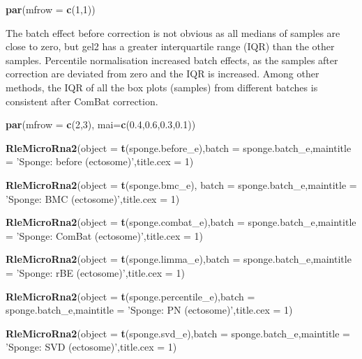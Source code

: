 \documentclass[]{book}
\newenvironment{Shaded}{\begin{snugshade}}{\end{snugshade}}
\newcommand{\KeywordTok}[1]{\textcolor[rgb]{0.13,0.29,0.53}{\textbf{#1}}}
\newcommand{\DataTypeTok}[1]{\textcolor[rgb]{0.13,0.29,0.53}{#1}}
\newcommand{\DecValTok}[1]{\textcolor[rgb]{0.00,0.00,0.81}{#1}}
\newcommand{\FloatTok}[1]{\textcolor[rgb]{0.00,0.00,0.81}{#1}}
\newcommand{\StringTok}[1]{\textcolor[rgb]{0.31,0.60,0.02}{#1}}
\newcommand{\NormalTok}[1]{#1}
\begin{document}
\begin{Shaded}
\begin{Highlighting}[]
\KeywordTok{par}\NormalTok{(}\DataTypeTok{mfrow =} \KeywordTok{c}\NormalTok{(}\DecValTok{1}\NormalTok{,}\DecValTok{1}\NormalTok{))}
\end{Highlighting}
\end{Shaded}

The batch effect before correction is not obvious as all medians of
samples are close to zero, but gel2 has a greater interquartile range
(IQR) than the other samples. Percentile normalisation increased batch
effects, as the samples after correction are deviated from zero and the
IQR is increased. Among other methods, the IQR of all the box plots
(samples) from different batches is consistent after ComBat correction.

\begin{Shaded}
\begin{Highlighting}[]
\KeywordTok{par}\NormalTok{(}\DataTypeTok{mfrow =} \KeywordTok{c}\NormalTok{(}\DecValTok{2}\NormalTok{,}\DecValTok{3}\NormalTok{), }\DataTypeTok{mai=}\KeywordTok{c}\NormalTok{(}\FloatTok{0.4}\NormalTok{,}\FloatTok{0.6}\NormalTok{,}\FloatTok{0.3}\NormalTok{,}\FloatTok{0.1}\NormalTok{))}

\KeywordTok{RleMicroRna2}\NormalTok{(}\DataTypeTok{object =} \KeywordTok{t}\NormalTok{(sponge.before_e),}\DataTypeTok{batch =}\NormalTok{ sponge.batch_e,}\DataTypeTok{maintitle =} \StringTok{'Sponge: before (ectosome)'}\NormalTok{,}\DataTypeTok{title.cex =} \DecValTok{1}\NormalTok{)}

\KeywordTok{RleMicroRna2}\NormalTok{(}\DataTypeTok{object =} \KeywordTok{t}\NormalTok{(sponge.bmc_e), }\DataTypeTok{batch =}\NormalTok{ sponge.batch_e,}\DataTypeTok{maintitle =} \StringTok{'Sponge: BMC (ectosome)'}\NormalTok{,}\DataTypeTok{title.cex =} \DecValTok{1}\NormalTok{)}

\KeywordTok{RleMicroRna2}\NormalTok{(}\DataTypeTok{object =} \KeywordTok{t}\NormalTok{(sponge.combat_e),}\DataTypeTok{batch =}\NormalTok{ sponge.batch_e,}\DataTypeTok{maintitle =} \StringTok{'Sponge: ComBat (ectosome)'}\NormalTok{,}\DataTypeTok{title.cex =} \DecValTok{1}\NormalTok{)}

\KeywordTok{RleMicroRna2}\NormalTok{(}\DataTypeTok{object =} \KeywordTok{t}\NormalTok{(sponge.limma_e),}\DataTypeTok{batch =}\NormalTok{ sponge.batch_e,}\DataTypeTok{maintitle =} \StringTok{'Sponge: rBE (ectosome)'}\NormalTok{,}\DataTypeTok{title.cex =} \DecValTok{1}\NormalTok{)}

\KeywordTok{RleMicroRna2}\NormalTok{(}\DataTypeTok{object =} \KeywordTok{t}\NormalTok{(sponge.percentile_e),}\DataTypeTok{batch =}\NormalTok{ sponge.batch_e,}\DataTypeTok{maintitle =} \StringTok{'Sponge: PN (ectosome)'}\NormalTok{,}\DataTypeTok{title.cex =} \DecValTok{1}\NormalTok{)}

\KeywordTok{RleMicroRna2}\NormalTok{(}\DataTypeTok{object =} \KeywordTok{t}\NormalTok{(sponge.svd_e),}\DataTypeTok{batch =}\NormalTok{ sponge.batch_e,}\DataTypeTok{maintitle =} \StringTok{'Sponge: SVD (ectosome)'}\NormalTok{,}\DataTypeTok{title.cex =} \DecValTok{1}\NormalTok{)}
\end{Highlighting}
\end{Shaded}
\end{document}

